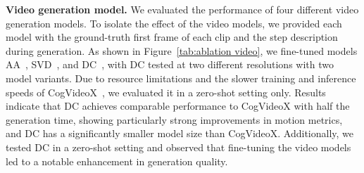 \begin{table}[t]
\centering
{}
\caption{Ablations on video generation models. During inference, the model is provided with ground truth initial frames and LLM-fused step descriptions. ``zs." stands for zero-shot models, ``ft." indicates fine-tuned models. DC$_{512}$ refers to the generated videos have a resolution of $512\times$320. DC$_{1024}$ refers to the generated videos have a resolution of $1024\times$576.}
\label{tab:ablation video}
\vspace{-10pt}
\end{table}

\textbf{Video generation model.} We evaluated the performance of four different video generation models. To isolate the effect of the video models, we provided each model with the ground-truth first frame of each clip and the step description during generation. As shown in Figure~\ref{tab:ablation video}, we fine-tuned models AA~\cite{aa}, SVD~\cite{SVD}, and DC~\cite{dynamicrafter}, with DC tested at two different resolutions with two model variants. Due to resource limitations and the slower training and inference speeds of CogVideoX~\cite{cogvideox}, we evaluated it in a zero-shot setting only. Results indicate that DC achieves comparable performance to CogVideoX with half the generation time, showing particularly strong improvements in motion metrics, and DC has a significantly smaller model size than CogVideoX. Additionally, we tested DC in a zero-shot setting and observed that fine-tuning the video models led to a notable enhancement in generation quality.

